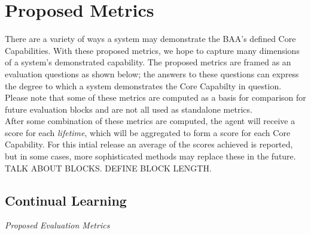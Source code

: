 \chapter{Proposed Metrics}\label{ch:metrics_syllabus}

There are a variety of ways a system may demonstrate the BAA's defined Core Capabilities. With these proposed metrics, we hope to capture many dimensions of a system's demonstrated capability. The proposed metrics are framed as an evaluation questions as shown below; the answers to these questions can express the degree to which a system demonstrates the Core Capabilty in question. Please note that some of these metrics are computed as a basis for comparison for future evaluation blocks and are not all used as standalone metrics. \\[0.1in]

After some combination of these metrics are computed, the agent will receive a score for each \textit{lifetime}, which will be aggregated to form a score for each Core Capability. For this intial release an average of the scores achieved is reported, but in some cases, more sophisticated methods may replace these in the future.\\[0.2in]

TALK ABOUT BLOCKS. DEFINE BLOCK LENGTH.


\section{Continual Learning}

\begin{large}
\textit{Proposed Evaluation Metrics}\\[0.1in]
\end{large}


